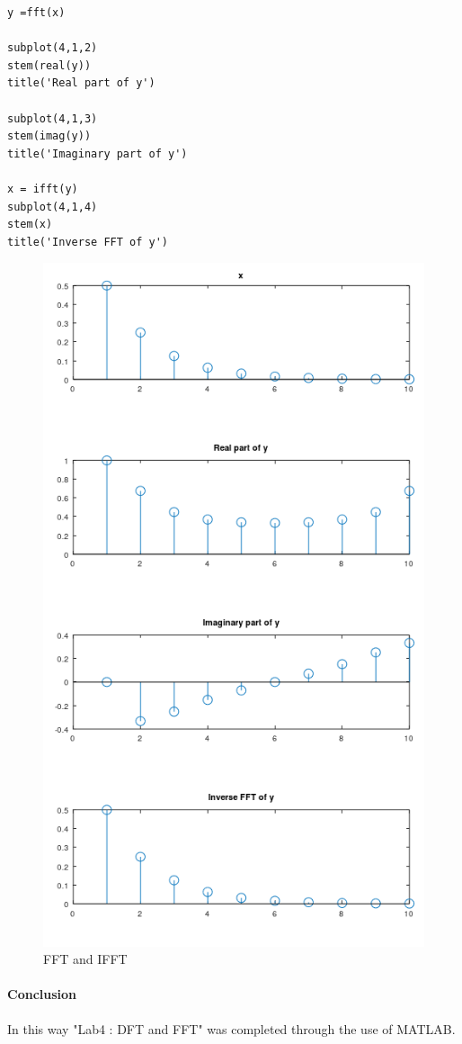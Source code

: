 \documentclass[12pt]{article}
\begin{document}
\begin{enumerate}
\begin{Verbatim}[frame = single]
y =fft(x)

subplot(4,1,2)
stem(real(y))
title('Real part of y')

subplot(4,1,3)
stem(imag(y))
title('Imaginary part of y')

x = ifft(y)
subplot(4,1,4)
stem(x)
title('Inverse FFT of y')

    \end{Verbatim}
    \begin{figure}[h!]
        \centering
        \includegraphics[scale=0.75]{labss/Lab4_4.PNG}
        \caption{FFT and IFFT}
    \end{figure}
\end{enumerate}
\paragraph{Conclusion\\}
In this way "Lab4 : DFT and FFT" was completed through the use of MATLAB. 
\end{document}
